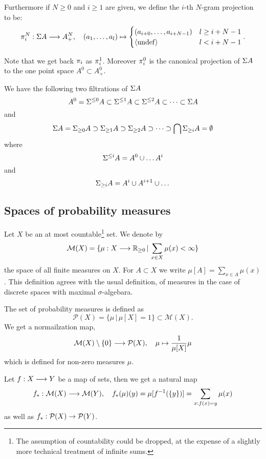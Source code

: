 \documentclass[11pt]{article}
\begin{document}
Furthermore if $N \geq 0$ and $i \geq 1$ are given, we define the $i$-th $N$-gram
projection to be:
\[ {\pi_{i}^{N}}: \Sigma A \longrightarrow A^N_+, \quad (a_1, \dots, a_l) \mapsto
\begin{cases}
(a_{i+0},\dots,a_{i+N-1})  & l \geq i+N-1  \\
\langle \mathrm{undef} \rangle                   & l < i+N-1
\end{cases}.\]

Note that we get back ${\pi_{i}}$ as ${\pi_{i}^{1}}$. Moreover ${\pi_{i}^{0}}$ is the
canonical projection of $\Sigma A$ to the one point space $A^0 \subset
A^0_+$.

We have the following two filtrations of $\Sigma A$
\[ A^0 = \Sigma^{\leq 0} A \subset \Sigma^{\leq 1} A \subset \Sigma^{\leq
  2} A \subset \dots \subset \Sigma A \]
and 
\[ \Sigma A = \Sigma_{\geq 0} A \supset \Sigma_{\geq 1} A \supset \Sigma_{\geq
  2} A \supset \dots \supset \bigcap \Sigma_{\geq i} A = \emptyset  \]
where 
\[ \Sigma^{\leq i} A = A^{0} \cup \dots A^{i} \]
and
\[ \Sigma_{\geq i} A = A^{i} \cup A^{i + 1} \cup \dots \]

\subsection{Spaces of probability measures}
\label{sec-1-2}

\newcommand{\MES}{\mathcal{M}}  %
\newcommand{\PROB}{\mathcal{P}}  %
\newcommand{\EXP}[2]{E_{#1}[#2]} %

Let $X$ be an at most countable\footnote{The assumption of
  countability could be dropped, at the expense of a slightly more
  technical treatment of infinite sums.} set. We denote by
\[ 
   \MES(X) = \{ \mu: X \lra \IR_{\geq 0} \,|\, \sum_{x \in X} \mu(x) <
\infty \}
\]
the space of all finite measures on $X$. For $A \subset X$ we write
$\mu[A] = \sum_{x \in A} \mu(x)$. This definition agrees with the
usual definition, of measures in the case of discrete spaces with
maximal $\sigma$-algebara.

The set of probability measures is defined as
\[ \PROB(X) = \{ \mu  \,|\,  \mu[X] = 1 \} \subset \MES(X). \]
We get a normailzation map,
\[ \MES (X) \setminus \{0\} \lra \PROB (X), \quad \mu \mapsto
\frac{1}{\mu[X]} \mu \]
which is defined for non-zero measures $\mu$.

Let $f:X \longrightarrow Y$ be a map of sets, then we get a natural map
\[ f_*: \MES(X) \lra \MES(Y), \quad
   f_*(\mu)(y) = \mu[ f^{-1}(\{y\})] = \sum_{x:f(x)=y} \mu(x) \]
as well as $f_*: \PROB(X) \ra \PROB(Y)$.
\end{document}
